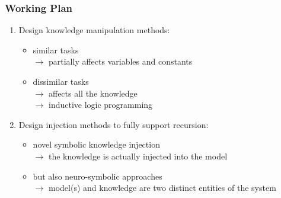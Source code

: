 \documentclass[presentation]{beamer}\mode<presentation>{\usetheme{blackAMSBolognaFC}}
\begin{document}
\begin{frame}
\frametitle{Working Plan}

    \begin{enumerate}
        \item  Design knowledge manipulation methods:
        \begin{itemize}
            \item similar tasks\\ $\rightarrow$ partially affects variables and constants
            \item dissimilar tasks\\ $\rightarrow$ affects all the knowledge\\  $\rightarrow$ inductive logic programming~
        \end{itemize}
        \vfill
        \item Design injection methods to fully support recursion:
        \begin{itemize}
            \item novel symbolic knowledge injection\\ $\rightarrow$ the knowledge is actually injected into the model
            \item but also neuro-symbolic approaches\\ $\rightarrow$ model(s) and knowledge are two distinct entities of the system
        \end{itemize}

    \end{enumerate}

\end{frame}
\end{document}
